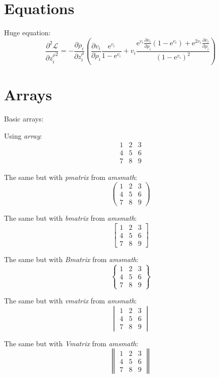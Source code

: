 \documentclass{scrartcl}
\newcommand*{\pderiv}[2]{\frac{\partial #1}{\partial #2}}
\newcommand*{\e}{\mathrm{e}}
\begin{document}
\section{Equations}

Huge equation:
\[
    \pderiv{^2 \mathcal{L}}{{z_i^\rho}^2} = 
    -\pderiv{\rho_i}{z_i^\rho}
    \left(
        \pderiv{v_i}{\rho_i}\frac{\e^{v_i}}{1-\e^{v_i}}
        +v_i\frac
        {\e^{v_i}\pderiv{v_i}{\rho_i}\left(1-\e^{v_i}\right) + \e^{2v_i}\pderiv{v_i}{\rho_i}}
        {(1-\e^{v_i})^2}
    \right)
\]

\section{Arrays}

Basic arrays:

Using \emph{array}:
\[
\begin{array}{rrr}
    1 & 2 & 3\\
    4 & 5 & 6\\
    7 & 8 & 9
\end{array}
\]

The same but with \emph{pmatrix} from \emph{amsmath}:
\[
\begin{pmatrix}
    1 & 2 & 3\\
    4 & 5 & 6\\
    7 & 8 & 9
\end{pmatrix}
\]

The same but with \emph{bmatrix} from \emph{amsmath}:
\[
\begin{bmatrix}
    1 & 2 & 3\\
    4 & 5 & 6\\
    7 & 8 & 9
\end{bmatrix}
\]

The same but with \emph{Bmatrix} from \emph{amsmath}:
\[
\begin{Bmatrix}
    1 & 2 & 3\\
    4 & 5 & 6\\
    7 & 8 & 9
\end{Bmatrix}
\]

The same but with \emph{vmatrix} from \emph{amsmath}:
\[
\begin{vmatrix}
    1 & 2 & 3\\
    4 & 5 & 6\\
    7 & 8 & 9
\end{vmatrix}
\]

The same but with \emph{Vmatrix} from \emph{amsmath}:
\[
\begin{Vmatrix}
    1 & 2 & 3\\
    4 & 5 & 6\\
    7 & 8 & 9
\end{Vmatrix}
\]
\end{document}
